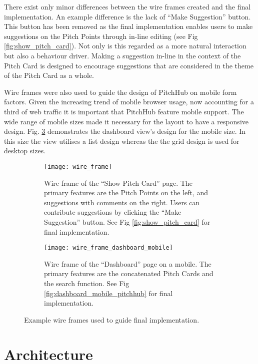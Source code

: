 There exist only minor differences between the wire frames created and the final implementation. An example difference is the lack of ``Make Suggestion'' button. This button has been removed as the final implementation enables users to make suggestions on the Pitch Points through in-line editing (see Fig \ref{fig:show_pitch_card}). Not only is this regarded as a more natural interaction but also a behaviour driver. Making a suggestion in-line in the context of the Pitch Card is designed to encourage suggestions that are considered in the theme of the Pitch Card as a whole.

Wire frames were also used to guide the design of PitchHub on mobile form factors. Given the increasing trend of mobile browser usage, now accounting for a third of web traffic \cite{Mobile_rise:online} it is important that PitchHub feature mobile support. The wide range of mobile sizes made it necessary for the layout to have a responsive design. Fig. \ref{fig:wire_frame_mobile} demonstrates the dashboard view's design for the mobile size. In this size the view utilises a list design whereas the the grid design is used for desktop sizes.

\begin{figure}[ht]
  \begin{subfigure}[t]{.45\textwidth}
  \centering
    \texttt{[image: wire\_frame]}
    \caption{Wire frame of the ``Show Pitch Card'' page. The primary features are the Pitch Points on the left, and suggestions with comments on the right. Users can contribute suggestions by clicking the ``Make Suggestion'' button. See Fig \ref{fig:show_pitch_card} for final implementation.}
    \label{fig:wire_frame}
  \end{subfigure}\hfill
  \begin{subfigure}[t]{.45\textwidth}
  \centering
    \texttt{[image: wire\_frame\_dashboard\_mobile]}
    \caption{Wire frame of the ``Dashboard'' page on a mobile. The primary features are the concatenated Pitch Cards and the search function. See Fig \ref{fig:dashboard_mobile_pitchhub} for final implementation.}
    \label{fig:wire_frame_mobile}
  \end{subfigure}
  \caption{Example wire frames used to guide final implementation.}
\end{figure}

\section{Architecture}

